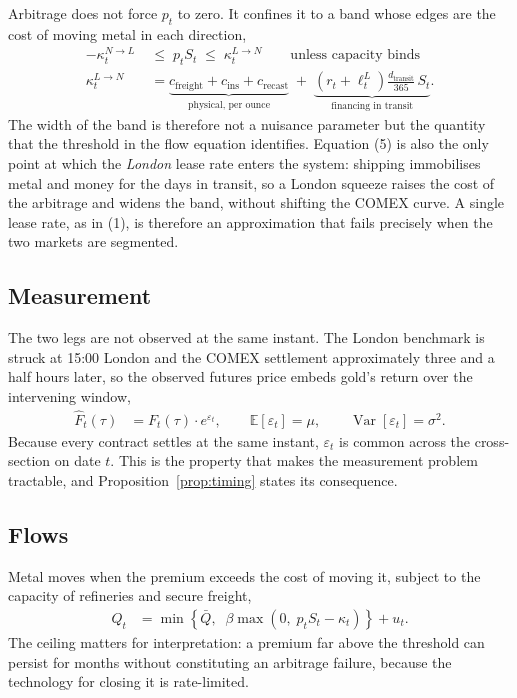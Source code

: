 \documentclass[11pt,a4paper]{article}
\newcommand{\lL}{\ell^{L}_{t}}
\newcommand{\kLN}{\kappa^{L\to N}_{t}}
\newcommand{\kNL}{\kappa^{N\to L}_{t}}
\newcommand{\Fhat}{\widehat{F}}
\newcommand{\Var}{\operatorname{Var}}
\begin{document}
Arbitrage does not force $p_t$ to zero. It confines it to a band whose edges
are the cost of moving metal in each direction,
\begin{align}
-\kNL \;&\le\; p_t S_t \;\le\; \kLN
   \qquad\text{unless capacity binds} \\[2pt]
\kLN &= \underbrace{c_{\text{freight}}+c_{\text{ins}}+c_{\text{recast}}}_{\text{physical, per ounce}}
   \;+\; \underbrace{\left(r_t+\lL\right)\frac{d_{\text{transit}}}{365}\,S_t}_{\text{financing in transit}} .
\end{align}
The width of the band is therefore not a nuisance parameter but the quantity
that the threshold in the flow equation identifies. Equation (5) is also the
only point at which the \emph{London} lease rate enters the system: shipping
immobilises metal and money for the days in transit, so a London squeeze raises
the cost of the arbitrage and widens the band, without shifting the COMEX
curve. A single lease rate, as in (1), is therefore an approximation that fails
precisely when the two markets are segmented.

\subsection{Measurement}

The two legs are not observed at the same instant. The London benchmark is
struck at 15:00 London and the COMEX settlement approximately three and a half
hours later, so the observed futures price embeds gold's return over the
intervening window,
\begin{align}
\Fhat_t(\tau) &= F_t(\tau)\cdot e^{\varepsilon_t},
   \qquad \mathbb{E}[\varepsilon_t]=\mu,
   \qquad \Var[\varepsilon_t]=\sigma^{2}.
\end{align}
Because every contract settles at the same instant, $\varepsilon_t$ is common
across the cross-section on date $t$. This is the property that makes the
measurement problem tractable, and Proposition~\ref{prop:timing} states its
consequence.

\subsection{Flows}

Metal moves when the premium exceeds the cost of moving it, subject to the
capacity of refineries and secure freight,
\begin{align}
Q_t &= \min\!\left\{\bar{Q},\;\;\beta\max\!\left(0,\;p_t S_t-\kappa_t\right)\right\}+u_t .
\end{align}
The ceiling matters for interpretation: a premium far above the threshold can
persist for months without constituting an arbitrage failure, because the
technology for closing it is rate-limited.
\end{document}
